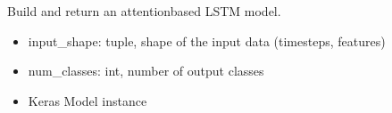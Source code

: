 \documentclass[letterpaper,10pt,english]{sphinxmanual}
\begin{document}
\begin{fulllineitems}
\label{\detokenize{lstm_attention_model:lstm_attention_model.build_attention_model}}
\pysigstartsignatures
{}
\pysigstopsignatures
\sphinxAtStartPar
Build and return an attention\sphinxhyphen{}based LSTM model.
\begin{description}
\begin{itemize}
\item {} 
\sphinxAtStartPar
input\_shape: tuple, shape of the input data (timesteps, features)

\item {} 
\sphinxAtStartPar
num\_classes: int, number of output classes

\end{itemize}

\begin{itemize}
\item {} 
\sphinxAtStartPar
Keras Model instance

\end{itemize}

\end{description}

\end{fulllineitems}

\end{document}
